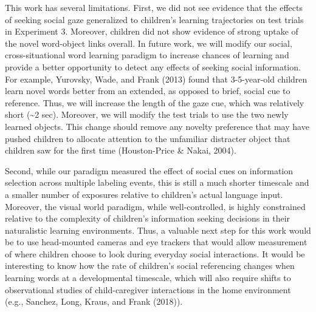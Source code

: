 \documentclass[man,floatsintext]{apa6}
\begin{document}
This work has several limitations. First, we did not see evidence that
the effects of seeking social gaze generalized to children's learning
trajectories on test trials in Experiment 3. Moreover, children did not
show evidence of strong uptake of the novel word-object links overall.
In future work, we will modify our social, cross-situational word
learning paradigm to increase chances of learning and provide a better
opportunity to detect any effects of seeking social information. For
example, Yurovsky, Wade, and Frank (2013) found that 3-5-year-old
children learn novel words better from an extended, as opposed to brief,
social cue to reference. Thus, we will increase the length of the gaze
cue, which was relatively short (\textasciitilde{}2 sec). Moreover, we
will modify the test trials to use the two newly learned objects. This
change should remove any novelty preference that may have pushed
children to allocate attention to the unfamiliar distracter object that
children saw for the first time (Houston-Price \& Nakai, 2004).

Second, while our paradigm measured the effect of social cues on
information selection across multiple labeling events, this is still a
much shorter timescale and a smaller number of exposures relative to
children's actual language input. Moreover, the visual world paradigm,
while well-controlled, is highly constrained relative to the complexity
of children's information seeking decisions in their naturalistic
learning environments. Thus, a valuable next step for this work would be
to use head-mounted cameras and eye trackers that would allow
measurement of where children choose to look during everyday social
interactions. It would be interesting to know how the rate of children's
social referencing changes when learning words at a developmental
timescale, which will also require shifts to observational studies of
child-caregiver interactions in the home environment (e.g., Sanchez,
Long, Kraus, and Frank (2018)).
\end{document}
